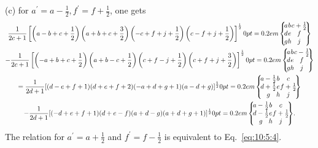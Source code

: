 (c) for $a^{\prime}=a-\frac{1}{2}, f^{\prime}=f+\frac{1}{2}$, one gets
\begin{gather}
\frac{1}{2 c+1}\left[\left(a-b+c+\frac{1}{2}\right)\left(a+b+c+\frac{3}{2}\right)\left(-c+f+j+\frac{1}{2}\right)\left(c-f+j+\frac{1}{2}\right)\right]^{\frac{1}{2}}\ninej{a}{b}{c+\frac{1}{2}}{d}{e}{f}{g}{h}{j}  \notag\\
-\frac{1}{2 c+1}\left[\left(-a+b+c+\frac{1}{2}\right)\left(a+b-c+\frac{1}{2}\right)\left(c+f-j+\frac{1}{2}\right)\left(c+f+j+\frac{3}{2}\right)\right]^{\frac{1}{2}}\ninej{a}{b}{c-\frac{1}{2}}{d}{e}{f}{g}{h}{j}  \notag\\
=\frac{1}{2 d+1}[(d-e+f+1)(d+e+f+2)(-a+d+g+1)(a-d+g)]^{\frac{1}{2}}\ninej{a-\frac{1}{2}}{b}{c}{d+\frac{1}{2}}{e}{f+\frac{1}{2}}{g}{h}{j}  \notag\\
-\frac{1}{2 d+1}[(-d+e+f+1)(d+e-f)(a+d-g)(a+d+g+1)]^{\frac{1}{2}}\ninej{a-\frac{1}{2}}{b}{c}{d-\frac{1}{2}}{e}{f+\frac{1}{2}}{g}{h}{j} . \label{eq:10:5:4}
\end{gather}
The relation for $a^{\prime}=a+\frac{1}{2}$ and $f^{\prime}=f-\frac{1}{2}$ is equivalent to Eq.~\eqref{eq:10:5:4}.

